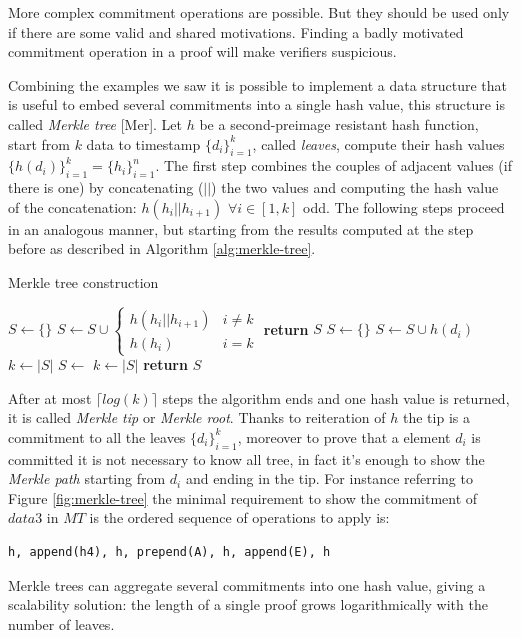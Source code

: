 More complex commitment operations are possible.
But they should be used only if there are some valid and shared motivations. Finding a badly motivated commitment operation in a proof will make verifiers suspicious.

Combining the examples we saw it is possible to implement a data structure that is useful to embed several commitments into a single hash value, 
this structure is called \textit{Merkle tree} [Mer]. Let $h$ be a second-preimage resistant hash function, start from $k$ data to timestamp $\{d_i\}_{i=1}^k$, called \textit{leaves}, compute their hash values $\{h(d_i)\}_{i=1}^k=\{h_i\}_{i=1}^n$. The first step combines the couples of adjacent values (if there is one) by concatenating ($||$) the two values and computing the hash value of the concatenation: $h(h_i||h_{i+1})$ $\forall i \in [1,k]$ odd. The following steps proceed in an analogous manner, but starting from the results computed at the step before as described in Algorithm \ref{alg:merkle-tree}. 

\begin{algorithm}
	\caption{Merkle tree construction}
	\label{alg:merkle-tree}
	\begin{algorithmic}[1]
		\State $S \gets \{\}$
		\State $S \gets S \cup \begin{cases} 
		h(h_i||h_{i+1}) & i \neq k \\ 
		h(h_i) & i=k           
		\end{cases}$
		\EndFor
		\State \textbf{return} $S$
		\EndProcedure
		\Statex
		 
		\State $S \gets \{\}$
		\State $S\gets S \cup h(d_i)$
		\EndFor
		\State $k\gets |S|$
		\State $S \gets$  
		\State $k\gets |S|$
		\EndWhile
		\State \textbf{return} $S$ 
		\EndProcedure
	\end{algorithmic}
\end{algorithm}

After at most $\lceil log(k) \rceil$ steps the algorithm ends and one hash value is returned, it is called \textit{Merkle tip} or \textit{Merkle root}. 
Thanks to reiteration of $h$ the tip is a commitment to all the leaves $\{d_i\}_{i=1}^k$, moreover to prove that a element $d_i$ is committed it is not necessary to know all tree, in fact it's enough to show the \textit{Merkle path} starting from $d_i$ and ending in the tip. 
For instance referring to Figure \ref{fig:merkle-tree} the minimal requirement to show the commitment of $data3$ in $MT$ is the ordered sequence of operations to apply is:
\begin{verbatim}
h, append(h4), h, prepend(A), h, append(E), h
\end{verbatim}
Merkle trees can aggregate several commitments into one hash value, giving a scalability solution: the length of a single proof grows logarithmically with the number of leaves.

